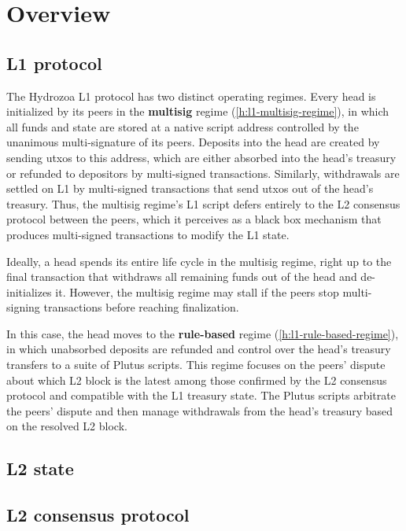 \documentclass[../hydrozoa.tex]{subfiles}
\begin{document}
\chapter*{Overview}%
\label{h:introduction}%
%


\section*{L1 protocol}%
\label{h:l1-protocol}%
%

The Hydrozoa L1 protocol has two distinct operating regimes.
Every head is initialized by its peers in the \textbf{multisig} regime (\cref{h:l1-multisig-regime}), in which all funds and state are stored at a native script address controlled by the unanimous multi-signature of its peers.
Deposits into the head are created by sending utxos to this address, which are either absorbed into the head's treasury or refunded to depositors by multi-signed transactions.
Similarly, withdrawals are settled on L1 by multi-signed transactions that send utxos out of the head's treasury.
Thus, the multisig regime's L1 script defers entirely to the L2 consensus protocol between the peers, which it perceives as a black box mechanism that produces multi-signed transactions to modify the L1 state.

Ideally, a head spends its entire life cycle in the multisig regime, right up to the final transaction that withdraws all remaining funds out of the head and de-initializes it.
However, the multisig regime may stall if the peers stop multi-signing transactions before reaching finalization.

In this case, the head moves to the \textbf{rule-based} regime (\cref{h:l1-rule-based-regime}), in which unabsorbed deposits are refunded and control over the head's treasury transfers to a suite of Plutus scripts. 
This regime focuses on the peers' dispute about which L2 block is the latest among those confirmed by the L2 consensus protocol and compatible with the L1 treasury state.
The Plutus scripts arbitrate the peers' dispute and then manage withdrawals from the head's treasury based on the resolved L2 block.


\section*{L2 state}%
\label{h:l2-state}%
%


\section*{L2 consensus protocol}%
\label{h:l2-consensus-protocol}%
%

\end{document}
